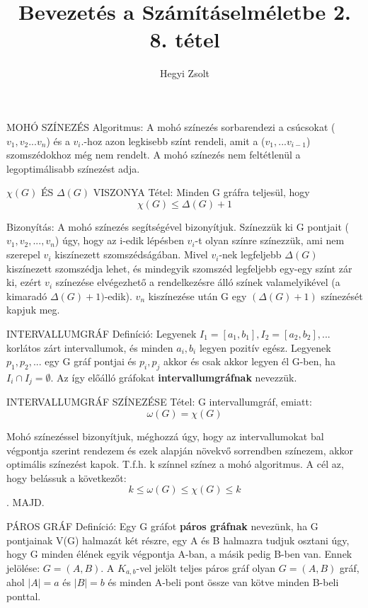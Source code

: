 \documentclass[]{article}
\title{Bevezetés a Számításelméletbe 2.\\{\large 8. tétel}}
\author{Hegyi Zsolt}
\begin{document}
\maketitle
\begin{framed}
MOHÓ SZÍNEZÉS Algoritmus: A mohó színezés sorbarendezi a csúcsokat ($v_1, v_2...v_n$) és a $v_i.$-hoz azon legkisebb színt rendeli, amit a ($v_1,...v_{i-1}$) szomszédokhoz még nem rendelt. A mohó színezés nem feltétlenül a legoptimálisabb színezést adja.
\end{framed}
\begin{framed}
$\chi(G)$ ÉS $\Delta(G)$ VISZONYA Tétel: Minden	G gráfra teljesül, hogy
$$\chi(G) \leq \Delta(G)+1$$
\end{framed}
\begin{leftbar}
Bizonyítás: A mohó színezés segítségével bizonyítjuk. Színezzük ki G pontjait ($v_1, v_2,..., v_n$) úgy, hogy az i-edik lépésben $v_i$-t olyan színre színezzük, ami nem szerepel $v_i$ kiszínezett szomszédságában. Mivel $v_i$-nek legfeljebb $\Delta(G)$ kiszínezett szomszédja lehet, és mindegyik szomszéd legfeljebb egy-egy színt zár ki, ezért $v_i$ színezése elvégezhető a rendelkezésre álló színek valamelyikével (a kimaradó $\Delta(G)+1)$-edik). $v_n$ kiszínezése után G egy $(\Delta(G)+1)$ színezését kapjuk meg.
\end{leftbar}
\begin{shaded}
INTERVALLUMGRÁF Definíció: Legyenek $I_1 = [a_1, b_1], I_2 = [a_2, b_2],...$ korlátos zárt intervallumok, és minden $a_i, b_i$ legyen pozitív egész. Legyenek $p_1, p_2,...$ egy G gráf pontjai és ${p_i, p_j}$ akkor és csak akkor legyen él G-ben, ha $I_i\cap I_j = \emptyset$. Az így előálló gráfokat \textbf{intervallumgráfnak} nevezzük.
\end{shaded}
\begin{framed}
INTERVALLUMGRÁF SZÍNEZÉSE Tétel: G intervallumgráf, emiatt:
$$\omega(G) = \chi(G)$$
\end{framed}
\begin{leftbar}
Mohó színezéssel bizonyítjuk, méghozzá úgy, hogy az intervallumokat bal végpontja szerint rendezem és ezek alapján növekvő sorrendben színezem, akkor optimális színezést kapok. T.f.h. k színnel színez a mohó algoritmus. A cél az, hogy belássuk a következőt:
$$k \leq \omega(G) \leq \chi(G) \leq k$$. MAJD.
\end{leftbar}
\begin{shaded}
PÁROS GRÁF Definíció: Egy G gráfot \textbf{páros gráfnak} nevezünk, ha G pontjainak V(G) halmazát két részre, egy A és B halmazra tudjuk osztani úgy, hogy G minden élének egyik végpontja A-ban, a másik pedig B-ben van. Ennek jelölése: $G = (A,B)$. A $K_{a,b}$-vel jelölt teljes páros gráf olyan $G=(A,B)$ gráf, ahol $|A| = a$ és $|B| = b$ és minden A-beli pont össze van kötve minden B-beli ponttal.
\end{shaded}
\end{document}
